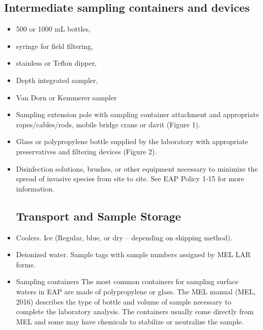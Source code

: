 \documentclass[12pt]{../SOP4_alpha}\usepackage[]{graphicx}\usepackage[]{xcolor}
\begin{document}
\subsection{Intermediate sampling containers and devices}

\begin{itemize}

\item 500 or 1000 mL bottles, 
\item syringe for field filtering, 
\item stainless or Teflon dipper, 
\item Depth integrated sampler, 
\item Van Dorn or Kemmerer sampler
\item Sampling extension pole with sampling container attachment and appropriate ropes/cables/rods, mobile bridge crane or davit  (Figure 1).  
\end{itemize}

\begin{itemize}



\item Glass or polypropylene bottle supplied by the laboratory with appropriate preservatives and filtering devices (Figure 2).  




\item Disinfection solutions, brushes, or other equipment necessary to minimize the spread of invasive species from site to site. See EAP Policy 1-15 for more information.  

\subsection{Transport and Sample Storage}

\item Coolers.  Ice (Regular, blue, or dry – depending on shipping method).  

\item Deionized water.  Sample tags with sample numbers assigned by MEL  LAR forms.  


\item Sampling containers  The most common containers for sampling surface waters in EAP are made of polypropylene or glass. The MEL manual (MEL, 2016) describes the type of bottle and volume of sample necessary to complete the laboratory analysis. The containers usually come directly from MEL and some may have chemicals to stabilize or neutralize the sample. 

\end{itemize}
\end{document}
